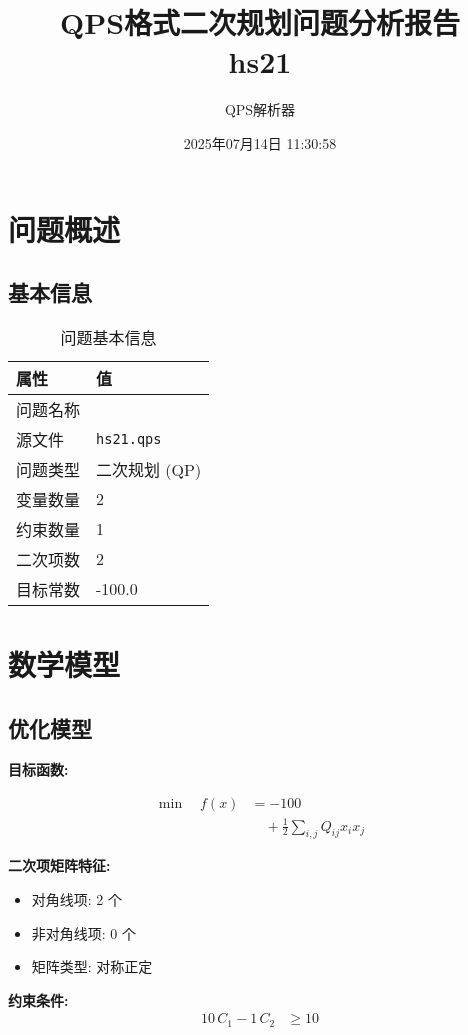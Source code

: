 \documentclass[a4paper,11pt]{article}
\title{QPS格式二次规划问题分析报告\\{\large hs21}}
\author{QPS解析器}
\date{2025年07月14日 11:30:58}
\begin{document}
\maketitle
\tableofcontents
\newpage

\section{问题概述}
\subsection{基本信息}
\begin{table}[h!]
\centering
\begin{tabular}{ll}
\toprule
\textbf{属性} & \textbf{值} \\
\midrule
问题名称 & \texttt{} \\
源文件 & \texttt{hs21.qps} \\
问题类型 & 二次规划 (QP) \\
变量数量 & 2 \\
约束数量 & 1 \\
二次项数 & 2 \\
目标常数 & -100.0 \\
\bottomrule
\end{tabular}
\caption{问题基本信息}
\end{table}

\section{数学模型}
\subsection{优化模型}

\textbf{目标函数:}

\begin{align}
\min\quad f(x) &= -100 \nonumber\\
&\quad + \frac{1}{2} \sum_{i,j} Q_{ij} x_i x_j\label{eq:objective}
\end{align}

\textbf{二次项矩阵特征:}
\begin{itemize}
\item 对角线项: 2 个
\item 非对角线项: 0 个
\item 矩阵类型: 对称正定
\end{itemize}

\textbf{约束条件:}
\begin{align}
10\,C_{1} - 1\,C_{2} &\geq 10 \nonumber
\end{align}
\end{document}
